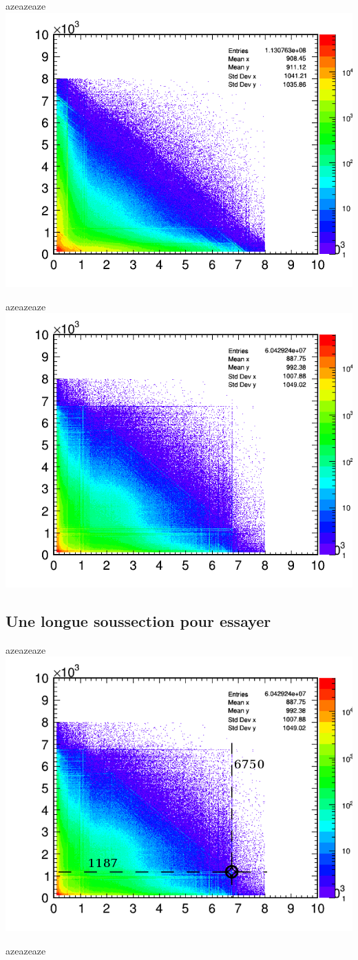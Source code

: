 \documentclass[aspectratio=169,12pt]{beamer}
\begin{document}
\begin{frame}[t]{azeazeaze}
\centering
\includegraphics[width=.5\linewidth]{img/155-m1h2.png}
\end{frame}
\begin{frame}[t]{azeazeaze}
\hypertarget{targetname}{}
\centering
    \includegraphics[width=.5\linewidth]{img/157-m2h2.png}
\end{frame}
\endgroup

\subsection{Une longue soussection pour essayer}
\begin{frame}[t]{azeazeaze}
\centering
    \includegraphics[width=.5\linewidth]{img/157-m2h2a.png}
\end{frame}
\begin{frame}[t]{azeazeaze}
\end{frame}

\end{document}
